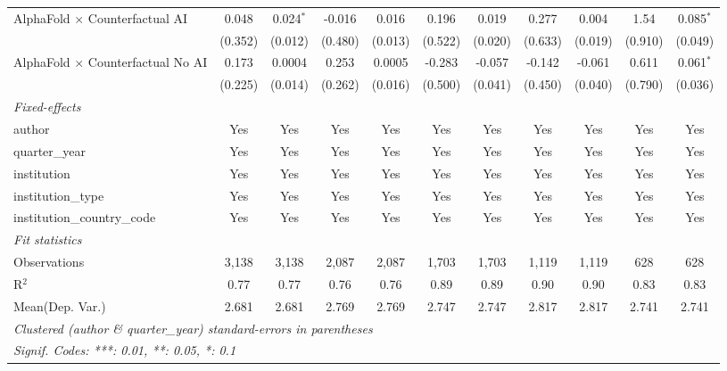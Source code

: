 \begin{tabular}{lcccccccccc}
   AlphaFold $\times$ Counterfactual AI     & 0.048   & 0.024$^{*}$ & -0.016  & 0.016   & 0.196   & 0.019   & 0.277   & 0.004   & 1.54    & 0.085$^{*}$\\   
                                            & (0.352) & (0.012)     & (0.480) & (0.013) & (0.522) & (0.020) & (0.633) & (0.019) & (0.910) & (0.049)\\   
   AlphaFold $\times$ Counterfactual No AI  & 0.173   & 0.0004      & 0.253   & 0.0005  & -0.283  & -0.057  & -0.142  & -0.061  & 0.611   & 0.061$^{*}$\\   
                                            & (0.225) & (0.014)     & (0.262) & (0.016) & (0.500) & (0.041) & (0.450) & (0.040) & (0.790) & (0.036)\\   
   \midrule
   \emph{Fixed-effects}\\
   author                                   & Yes     & Yes         & Yes     & Yes     & Yes     & Yes     & Yes     & Yes     & Yes     & Yes\\  
   quarter\_year                            & Yes     & Yes         & Yes     & Yes     & Yes     & Yes     & Yes     & Yes     & Yes     & Yes\\  
   institution                              & Yes     & Yes         & Yes     & Yes     & Yes     & Yes     & Yes     & Yes     & Yes     & Yes\\  
   institution\_type                        & Yes     & Yes         & Yes     & Yes     & Yes     & Yes     & Yes     & Yes     & Yes     & Yes\\  
   institution\_country\_code               & Yes     & Yes         & Yes     & Yes     & Yes     & Yes     & Yes     & Yes     & Yes     & Yes\\  
   \midrule
   \emph{Fit statistics}\\
   Observations                             & 3,138   & 3,138       & 2,087   & 2,087   & 1,703   & 1,703   & 1,119   & 1,119   & 628     & 628\\  
   R$^2$                                    & 0.77    & 0.77        & 0.76    & 0.76    & 0.89    & 0.89    & 0.90    & 0.90    & 0.83    & 0.83\\  
Mean(Dep. Var.) & 2.681 & 2.681 & 2.769 & 2.769 & 2.747 & 2.747 & 2.817 & 2.817 & 2.741 & 2.741 \\
   \midrule \midrule
   \multicolumn{11}{l}{\emph{Clustered (author \& quarter\_year) standard-errors in parentheses}}\\
   \multicolumn{11}{l}{\emph{Signif. Codes: ***: 0.01, **: 0.05, *: 0.1}}\\
\end{tabular}
\par\endgroup
